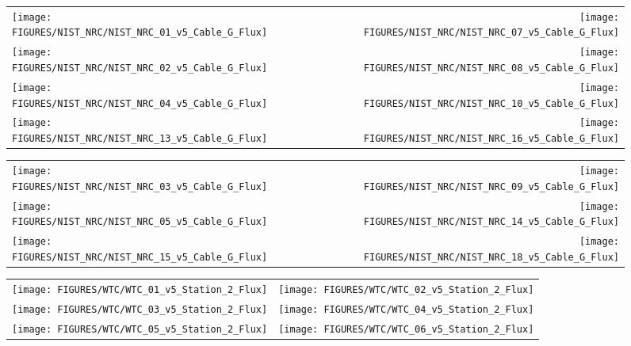 
\begin{figure}[h!]
\begin{tabular*}{\textwidth}{l@{\extracolsep{\fill}}r}
\texttt{[image: FIGURES/NIST\_NRC/NIST\_NRC\_01\_v5\_Cable\_G\_Flux]} &
\texttt{[image: FIGURES/NIST\_NRC/NIST\_NRC\_07\_v5\_Cable\_G\_Flux]} \\
\texttt{[image: FIGURES/NIST\_NRC/NIST\_NRC\_02\_v5\_Cable\_G\_Flux]} &
\texttt{[image: FIGURES/NIST\_NRC/NIST\_NRC\_08\_v5\_Cable\_G\_Flux]} \\
\texttt{[image: FIGURES/NIST\_NRC/NIST\_NRC\_04\_v5\_Cable\_G\_Flux]} &
\texttt{[image: FIGURES/NIST\_NRC/NIST\_NRC\_10\_v5\_Cable\_G\_Flux]} \\
\texttt{[image: FIGURES/NIST\_NRC/NIST\_NRC\_13\_v5\_Cable\_G\_Flux]} &
\texttt{[image: FIGURES/NIST\_NRC/NIST\_NRC\_16\_v5\_Cable\_G\_Flux]}
\end{tabular*}
\label{NIST_NRC_Cable_G_Flux_Closed}
\end{figure}

\begin{figure}[h!]
\begin{tabular*}{\textwidth}{l@{\extracolsep{\fill}}r}
\texttt{[image: FIGURES/NIST\_NRC/NIST\_NRC\_03\_v5\_Cable\_G\_Flux]} &
\texttt{[image: FIGURES/NIST\_NRC/NIST\_NRC\_09\_v5\_Cable\_G\_Flux]} \\
\texttt{[image: FIGURES/NIST\_NRC/NIST\_NRC\_05\_v5\_Cable\_G\_Flux]} &
\texttt{[image: FIGURES/NIST\_NRC/NIST\_NRC\_14\_v5\_Cable\_G\_Flux]} \\
\texttt{[image: FIGURES/NIST\_NRC/NIST\_NRC\_15\_v5\_Cable\_G\_Flux]} &
\texttt{[image: FIGURES/NIST\_NRC/NIST\_NRC\_18\_v5\_Cable\_G\_Flux]}
\end{tabular*}
\label{NIST_NRC_Cable_G_Flux_Open}
\end{figure}

\clearpage



\begin{figure}[h!]
\begin{tabular*}{\textwidth}{l@{\extracolsep{\fill}}r}
\texttt{[image: FIGURES/WTC/WTC\_01\_v5\_Station\_2\_Flux]} &
\texttt{[image: FIGURES/WTC/WTC\_02\_v5\_Station\_2\_Flux]} \\
\texttt{[image: FIGURES/WTC/WTC\_03\_v5\_Station\_2\_Flux]} &
\texttt{[image: FIGURES/WTC/WTC\_04\_v5\_Station\_2\_Flux]} \\
\texttt{[image: FIGURES/WTC/WTC\_05\_v5\_Station\_2\_Flux]} &
\texttt{[image: FIGURES/WTC/WTC\_06\_v5\_Station\_2\_Flux]}
\end{tabular*}
\label{NIST_WTC_Station_2_Flux}
\end{figure}


